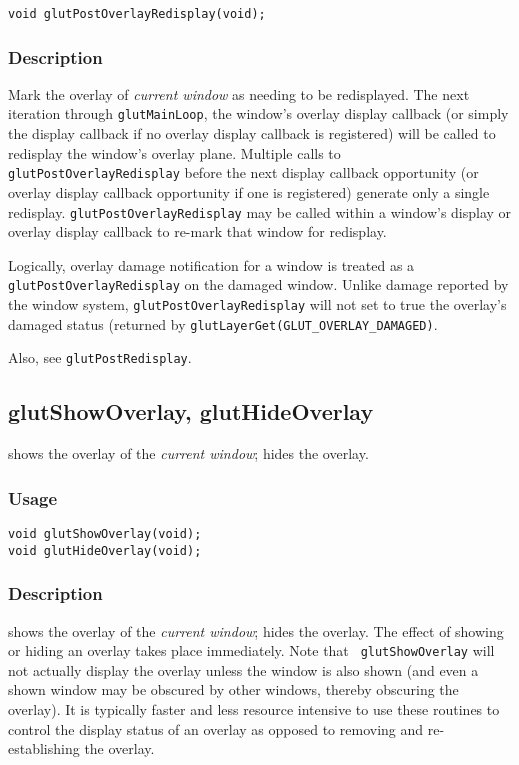 \begin{verbatim}
void glutPostOverlayRedisplay(void);
\end{verbatim}

\subsubsection*{Description}

Mark the overlay of {\em current window} as needing to be redisplayed.  The next iteration
through {\tt glutMainLoop}, the window's overlay display callback (or simply the
display callback if no overlay display callback is registered) will be called
to redisplay the window's overlay plane.  Multiple calls to {\tt glutPostOverlayRedisplay}
before the next display callback opportunity (or overlay display callback opportunity
if one is registered) generate only a single
redisplay.  {\tt glutPostOverlayRedisplay} may be called within a window's
display or overlay display callback to re-mark that window for redisplay.

Logically, overlay damage notification for a window is treated as a
{\tt glutPostOverlayRedisplay} on the damaged window.  Unlike damage reported by
the window system, {\tt glutPostOverlayRedisplay} will not set to true the overlay's
damaged status (returned by {\tt glutLayerGet(GLUT\_OVERLAY\_DAMAGED)}.

Also, see {\tt glutPostRedisplay}.

\subsection{glutShowOverlay, glutHideOverlay}

 shows the overlay of the {\em current window};
 hides the overlay.

\subsubsection*{Usage}

\begin{verbatim}
void glutShowOverlay(void);
void glutHideOverlay(void);
\end{verbatim}

\subsubsection*{Description}

 shows the overlay of the {\em current window};
 hides the overlay.  The effect of showing or
hiding an overlay takes place immediately.  Note that {\tt
glutShowOverlay} will not actually display the overlay unless the
window is also shown (and even a shown window may be obscured by other
windows, thereby obscuring the overlay).  It is typically faster and
less resource intensive to use these routines to control the display
status of an overlay as opposed to removing and re-establishing the
overlay.

